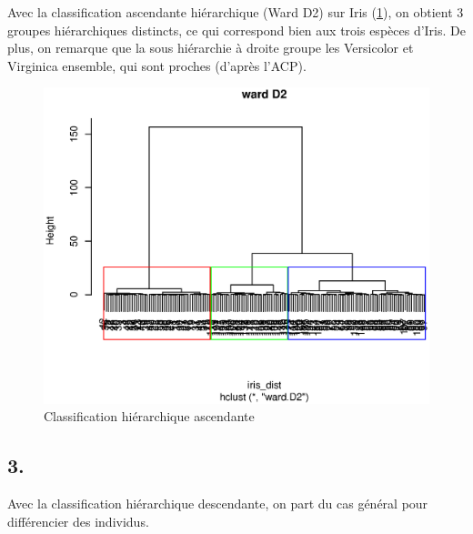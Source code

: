 \documentclass{article}
\begin{document}
Avec la classification ascendante hiérarchique (Ward D2) sur Iris (\ref{iris_cah_col}), on obtient 3 groupes hiérarchiques distincts, ce qui correspond bien aux trois espèces d'Iris. De plus, on remarque que la sous hiérarchie à droite groupe les Versicolor et Virginica ensemble, qui sont proches (d'après l'ACP).

\begin{figure}[H]
\centering
\includegraphics[scale=0.55]{./img/iris_cah_col.eps}
\caption{Classification hiérarchique ascendante}
\label{iris_cah_col}
\end{figure}


\subsection*{3.}

Avec la classification hiérarchique descendante, on part du cas général pour différencier des individus.
\end{document}

